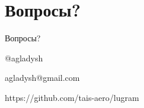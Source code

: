 \documentclass[aspectratio=169,handout,bigger]{beamer}
\begin{document}

\section{Вопросы?}


\begin{frame}[plain]{Вопросы?}

\begin{center}
\Huge{@agladysh}
\end{center}

\begin{center}
\Large{agladysh@gmail.com}
\end{center}

\begin{center}
https://github.com/tais-aero/lugram
\end{center}

\end{frame}

\end{document}
